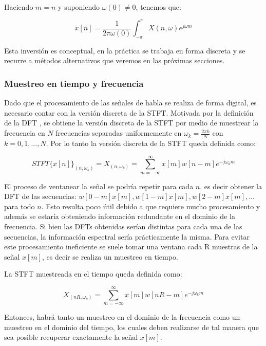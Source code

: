 Haciendo $m=n$ y suponiendo $\omega(0) \neq 0$, tenemos que:

\begin{equation*}
	x[n] = \frac{1}{2 \pi \omega(0)} \int_{- \pi}^{\pi} X(n, \omega) e^{j \omega m}
\end{equation*}

Esta inversión es conceptual, en la práctica se trabaja en forma discreta y se recurre a métodos alternativos que veremos en las próximas secciones.

\subsubsection{Muestreo en tiempo y frecuencia}
\label{sec:muestreo_en_tiempo_y_frecuencia}

Dado que el procesamiento de las señales de habla se realiza de forma digital, es necesario contar con la versión discreta de la STFT. Motivada por la definición de la DFT \cite{oppenheim_schafer}, se obtiene la versión discreta de la STFT por medio de muestrear la frecuencia en $N$ frecuencias separadas uniformemente en $\omega_k = \frac{2 \pi k}{N}$ con $k = 0, 1, ..., N$. Por lo tanto la versión discreta de la STFT queda definida como:

\begin{equation}
	STFT\{x[n]\}_{(n, \omega_k)} = X_{(n, \omega_k)} = \sum_{m=-\infty}^{\infty} x[m]w[n-m]e^{-j \omega_k m}
	\label{eq:stft_def}
\end{equation}

El proceso de ventanear la señal se podría repetir para cada $n$, es decir obtener la DFT de las secuencias: $w[0-m] x[m], w[1-m] x[m], w[2-m] x[m], ...$ para todo $n$. Esto resulta poco útil debido a que requiere mucho procesamiento y además se estaría obteniendo información redundante en el dominio de la frecuencia. Si bien las DFTs obtenidas serían distintas para cada una de las secuencias, la información espectral sería prácticamente la misma. Para evitar este procesamiento ineficiente se suele tomar una ventana cada R muestras de la señal $x[m]$, es decir se realiza un muestreo en tiempo. 

La STFT muestreada en el tiempo queda definida como:

\begin{equation}
	X_{(nR, \omega_k)} = \sum_{m=-\infty}^{\infty} x[m]w[nR-m]e^{-j \omega_k m}
	\label{eq:stft_def}
\end{equation}

Entonces, habrá tanto un muestreo en el dominio de la frecuencia como un muestreo en el dominio del tiempo, los cuales deben realizarse de tal manera que sea posible recuperar exactamente la señal $x[m]$.

